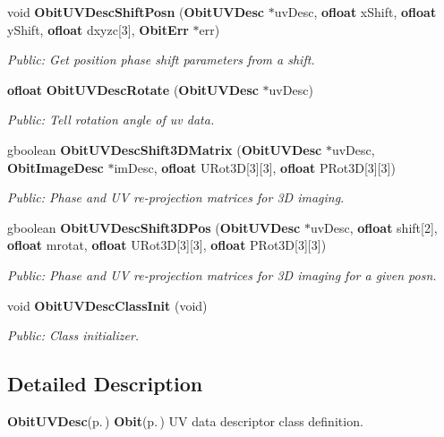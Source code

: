 \begin{CompactItemize}
void {\bf Obit\-UVDesc\-Shift\-Posn} ({\bf Obit\-UVDesc} $\ast$uv\-Desc, {\bf ofloat} x\-Shift, {\bf ofloat} y\-Shift, {\bf ofloat} dxyzc[3], {\bf Obit\-Err} $\ast$err)
\begin{CompactList}\small\item\em Public: Get position phase shift parameters from a shift. \item\end{CompactList}\item 
{\bf ofloat} {\bf Obit\-UVDesc\-Rotate} ({\bf Obit\-UVDesc} $\ast$uv\-Desc)
\begin{CompactList}\small\item\em Public: Tell rotation angle of uv data. \item\end{CompactList}\item 
gboolean {\bf Obit\-UVDesc\-Shift3DMatrix} ({\bf Obit\-UVDesc} $\ast$uv\-Desc, {\bf Obit\-Image\-Desc} $\ast$im\-Desc, {\bf ofloat} URot3D[3][3], {\bf ofloat} PRot3D[3][3])
\begin{CompactList}\small\item\em Public: Phase and UV re-projection matrices for 3D imaging. \item\end{CompactList}\item 
gboolean {\bf Obit\-UVDesc\-Shift3DPos} ({\bf Obit\-UVDesc} $\ast$uv\-Desc, {\bf ofloat} shift[2], {\bf ofloat} mrotat, {\bf ofloat} URot3D[3][3], {\bf ofloat} PRot3D[3][3])
\begin{CompactList}\small\item\em Public: Phase and UV re-projection matrices for 3D imaging for a given posn. \item\end{CompactList}\item 
void {\bf Obit\-UVDesc\-Class\-Init} (void)
\begin{CompactList}\small\item\em Public: Class initializer. \item\end{CompactList}\end{CompactItemize}


\subsection{Detailed Description}
{\bf Obit\-UVDesc}{\rm (p.\,\pageref{structObitUVDesc})} {\bf Obit}{\rm (p.\,\pageref{structObit})} UV data descriptor class definition. 

